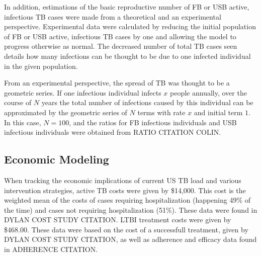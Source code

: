 \documentclass{amsart}
\begin{document}
In addition, estimations of the basic reproductive number of FB or USB active,
infectious TB cases were made from a theoretical and an experimental
perspective. Experimental data were calculated by reducing the initial
population of FB or USB active, infectious TB cases by one and allowing the
model to progress otherwise as normal. The decreased number of total TB cases
seen details how many infections can be thought to be due to one infected
individual in the given population.

From an experimental perspective, the spread of TB was thought to be a geometric
series. If one infectious individual infects $x$ people annually, over the
course of $N$ years the total number of infections caused by this individual can
be approximated by the geometric series of $N$ terms with rate $x$ and initial
term $1$. In this case, $N = 100$, and the ratios for FB infectious individuals
and USB infectious individuals were obtained from RATIO CITATION COLIN. 
\subsection{Economic Modeling}
When tracking the economic implications of current US TB load and various
intervention strategies, active TB costs were given by \$14,000. This cost is
the weighted mean of the costs of cases requiring hospitalization (happening
49\% of the time) and cases not requiring hospitalization (51\%). These data
were found in DYLAN COST STUDY CITATION. LTBI treatment costs were given by
\$468.00. These data were based on the cost of a successfull treatment, given by
DYLAN COST STUDY CITATION, as well as adherence and efficacy data found in
ADHERENCE CITATION.
\end{document}
